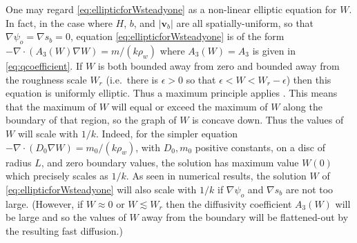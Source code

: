 \documentclass[gmd]{copernicus}   %
\newcommand\bv{\mathbf{v}}
\newcommand{\Div}{\nabla\cdot}
\newcommand\eps{\epsilon}
\newcommand{\grad}{\nabla}
\begin{document}
One may regard \eqref{eq:ellipticforWsteadyone} as a non-linear elliptic equation for $W$.  In fact, in the case where $H$, $b$, and $|\bv_b|$ are all spatially-uniform, so that $\grad \psi_o = \grad s_b = 0$, equation \eqref{eq:ellipticforWsteadyone} is of the form $-\Div \left(A_3(W) \grad W\right) = m/(k \rho_w)$ where $A_3(W) = A_3$ is given in \eqref{eq:qcoefficient}.  If $W$ is both bounded away from zero and bounded away from the roughness scale $W_r$ (i.e.~there is $\eps>0$ so that $\eps < W < W_r-\eps$) then this equation is uniformly elliptic.  Thus a maximum principle applies \citep{Evans}.  This means that the maximum of $W$ will equal or exceed the maximum of $W$ along the boundary of that region, so the graph of $W$ is concave down.  Thus the values of $W$ will scale with $1/k$.  Indeed, for the simpler equation $-\Div \left(D_0 \grad W\right) = m_0/(k \rho_w)$, with $D_0,m_0$ positive constants, on a disc of radius $L$, and zero boundary values, the solution has maximum value $W(0)$ which precisely scales as $1/k$.  As seen in numerical results, the solution $W$ of \eqref{eq:ellipticforWsteadyone} will also scale with $1/k$ if $\grad \psi_o$ and $\grad s_b$ are not too large.  (However, if $W\approx 0$  or $W\lesssim W_r$ then the diffusivity coefficient $A_3(W)$ will be large and so the values of $W$ away from the boundary will be flattened-out by the resulting fast diffusion.)


\end{document}
